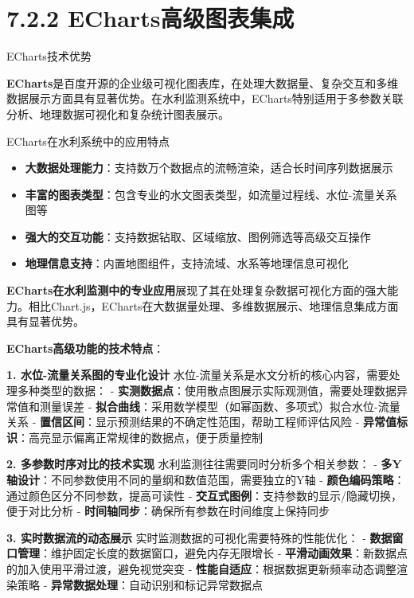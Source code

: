 \section{7.2.2 ECharts高级图表集成}

 ECharts技术优势

\textbf{ECharts}是百度开源的企业级可视化图表库，在处理大数据量、复杂交互和多维数据展示方面具有显著优势。在水利监测系统中，ECharts特别适用于多参数关联分析、地理数据可视化和复杂统计图表展示。

 ECharts在水利系统中的应用特点

\begin{itemize}
\tightlist
\item
  \textbf{大数据处理能力}：支持数万个数据点的流畅渲染，适合长时间序列数据展示
\item
  \textbf{丰富的图表类型}：包含专业的水文图表类型，如流量过程线、水位-流量关系图等
\item
  \textbf{强大的交互功能}：支持数据钻取、区域缩放、图例筛选等高级交互操作
\item
  \textbf{地理信息支持}：内置地图组件，支持流域、水系等地理信息可视化
\end{itemize}

\textbf{ECharts在水利监测中的专业应用}展现了其在处理复杂数据可视化方面的强大能力。相比Chart.js，ECharts在大数据量处理、多维数据展示、地理信息集成方面具有显著优势。

\textbf{ECharts高级功能的技术特点}：

\textbf{1. 水位-流量关系图的专业化设计} 水位-流量关系是水文分析的核心内容，需要处理多种类型的数据： - \textbf{实测数据点}：使用散点图展示实际观测值，需要处理数据异常值和测量误差 - \textbf{拟合曲线}：采用数学模型（如幂函数、多项式）拟合水位-流量关系 - \textbf{置信区间}：显示预测结果的不确定性范围，帮助工程师评估风险 - \textbf{异常值标识}：高亮显示偏离正常规律的数据点，便于质量控制

\textbf{2. 多参数时序对比的技术实现} 水利监测往往需要同时分析多个相关参数： - \textbf{多Y轴设计}：不同参数使用不同的量纲和数值范围，需要独立的Y轴 - \textbf{颜色编码策略}：通过颜色区分不同参数，提高可读性 - \textbf{交互式图例}：支持参数的显示/隐藏切换，便于对比分析 - \textbf{时间轴同步}：确保所有参数在时间维度上保持同步

\textbf{3. 实时数据流的动态展示} 实时监测数据的可视化需要特殊的性能优化： - \textbf{数据窗口管理}：维护固定长度的数据窗口，避免内存无限增长 - \textbf{平滑动画效果}：新数据点的加入使用平滑过渡，避免视觉突变 - \textbf{性能自适应}：根据数据更新频率动态调整渲染策略 - \textbf{异常数据处理}：自动识别和标记异常数据点

